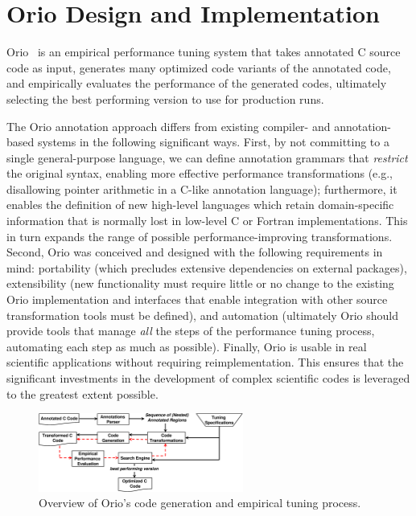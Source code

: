 \section{Orio Design and Implementation}
\label{sec:implm}

Orio~\cite{OrioURL} is an empirical performance tuning system that takes
annotated C source code as input, generates many optimized code variants of
the annotated code, and empirically evaluates the performance of the
generated codes, ultimately selecting the best performing version to use for
production runs.

The Orio annotation approach differs from existing compiler- and
annotation-based systems in the following significant ways.
%
First, by not committing to a single general-purpose language, we can define 
annotation grammars that \emph{restrict} the original syntax, enabling more
effective performance transformations (e.g., disallowing pointer arithmetic
in a C-like annotation language); furthermore, it enables the definition of
new high-level languages which retain domain-specific
information that is normally lost in low-level C or Fortran
implementations. This in turn expands the range of possible performance-improving 
transformations.
%
Second, Orio was conceived and designed with the following requirements in mind: 
portability (which precludes extensive dependencies on external packages),
extensibility (new functionality must require little or no change to the
existing Orio implementation and interfaces that enable integration with
other source transformation tools must be defined), and automation
(ultimately Orio should provide tools that manage
\emph{all} the steps of the performance tuning process, automating each step 
as much as possible).
%
Finally, Orio is usable in real scientific applications without
requiring reimplementation. This ensures that the significant investments in
the development of complex scientific codes is leveraged to the greatest
extent possible.

\begin{figure}[tb]
\vspace{-.2in}
\begin{center}  
\includegraphics[width=0.6\textwidth]{figures/orio.eps}   
\end{center}  
\vspace{-.2in}
\caption{Overview of Orio's code generation and empirical tuning process.}  
\label{fig:orio}  
\end{figure}  

